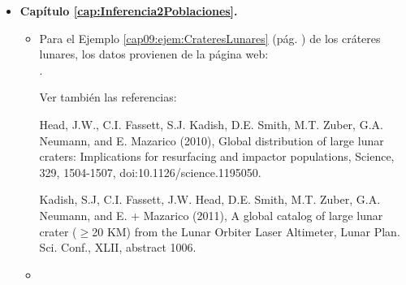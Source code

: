 \begin{itemize}
  \item[] {\bf Capítulo \ref{cap:Inferencia2Poblaciones}.}
      \begin{itemize}
      \item Para el Ejemplo \ref{cap09:ejem:CrateresLunares} (pág. \pageref{cap09:ejem:CrateresLunares}) de los cráteres lunares, los datos provienen de la página web:\\ .

        Ver también las referencias:

        Head, J.W., C.I. Fassett, S.J. Kadish, D.E. Smith, M.T. Zuber, G.A. Neumann, and E.
        Mazarico (2010), Global distribution of large lunar craters: Implications for
        resurfacing and impactor populations, Science, 329, 1504-1507,
        doi:10.1126/science.1195050.

        Kadish, S.J, C.I. Fassett, J.W. Head, D.E. Smith, M.T. Zuber, G.A. Neumann, and E. +
        Mazarico (2011), A global catalog of large lunar crater ($\geq$20 KM) from the Lunar
        Orbiter Laser Altimeter, Lunar Plan. Sci. Conf., XLII, abstract 1006.

          \item
        \end{itemize}


\end{itemize}

